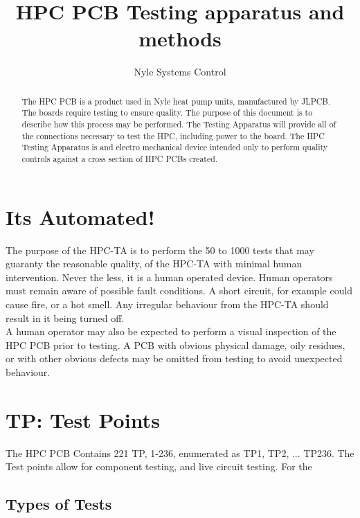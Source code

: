 \documentclass[]{article}
\title{HPC PCB Testing apparatus and methods}
\author{Nyle Systems Control}
\begin{document}
	
	\maketitle
	
	\begin{abstract}
		The HPC PCB is a product used in Nyle heat pump units, manufactured by JLPCB. The boards require testing to ensure quality. The purpose of this document is to describe how this process may be performed.
		The Testing Apparatus will provide all of the connections necessary to test the HPC, including power to the board. The HPC Testing Apparatus is and electro mechanical device intended only to perform quality controls against a cross section of HPC PCBs created. 
	\end{abstract}
	
	\section*{Its Automated!}
	The purpose of the HPC-TA  is to perform the 50 to 1000 tests that may guaranty the reasonable quality, of the HPC-TA with minimal human intervention. Never the less, it is a human operated device. Human operators must remain aware of possible fault conditions. A short circuit, for example could cause fire, or a hot smell. Any irregular behaviour from the HPC-TA should result in it being turned off. \\
	
	A human operator may also be expected to perform a visual inspection of the HPC PCB prior to testing. 
	A PCB with obvious physical damage, oily residues, or with other obvious defects may be omitted from testing to avoid unexpected behaviour. 
	
	\section*{TP: Test Points}
	The HPC PCB Contains 221 TP, 1-236, enumerated as TP1, TP2, ... TP236. The Test points allow for component testing, and live circuit testing. For the 
	\subsection*{Types of Tests}
\end{document}
